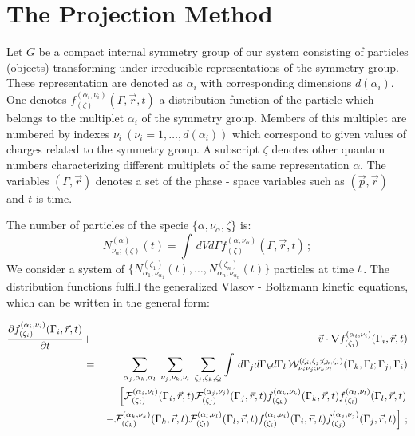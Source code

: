 \documentclass[a4paper,11pt]{article}
\begin{document}
\section{\normalsize\bf The Projection Method}\label{proj}
\noindent
 Let $G$ be a compact internal symmetry group of our system
consisting  of particles (objects) transforming under irreducible
representations of the symmetry group. These representation are
denoted as $\alpha_i$ with corresponding dimensions $d(\alpha_i)$.
One denotes $f^{(\alpha_i,\nu_i)}_{(\zeta)}(\Gamma,\vec r,t)$ a
distribution function of the particle which belongs to the
multiplet $\alpha_i$ of the symmetry group. Members of this
multiplet are numbered by indexes $\nu_i\
(\nu_i=1,\dots,d(\alpha_i))$ which correspond to given values of
charges related to the symmetry group. A subscript $\zeta$ denotes
other quantum numbers characterizing different multiplets of the
same representation $\alpha$.  The variables $(\Gamma,\vec r)$
denotes a  set of the phase - space variables such as $(\vec
p,\vec r)$ and $t$ is time.

The number of particles of the specie
$\{\alpha,\nu_\alpha,\zeta\}$ is:
\begin{equation}
N^{(\alpha)}_{\nu_\alpha;(\zeta)}(t)=\int\,dV d\Gamma
f^{(\alpha,\nu_\alpha)}_{(\zeta)}(\Gamma,\vec r,t)\,; \label{numb}
\end{equation}
We consider a system of
 $\{N_{\alpha_1, \nu_{\alpha_1}}^{(\zeta_1)}(t),\dots,
{N_{\alpha_n,\nu_{\alpha_n}}^{(\zeta_n)}(t)}\}$ particles at time
$t$\,.  The distribution functions fulfill the generalized Vlasov
- Boltzmann kinetic equations, which can be written in the general
form:

\begin{eqnarray}\label{kin}
{\partial f^{(\alpha_i,\nu_i)}_{(\zeta_i)}(\Gamma_i,\vec r,
t)\over\partial t}& + & \vec v\cdot\nabla
f^{(\alpha_i,\nu_i)}_{(\zeta_i)}(\Gamma_i,\vec r,t)\nonumber\\
&=&\sum_{\alpha_j,\alpha_k,\alpha_l}\;\sum_{\nu_j,\nu_k,\nu_l}\;
\sum_{\zeta_j,\zeta_k,\zeta_l}\int\, d\Gamma_j d\Gamma_k
d\Gamma_l\, {\cal
W}_{\nu_i\nu_j;\nu_k\nu_l}^{(\zeta_i,\zeta_j;\zeta_k,\zeta_l)}
(\Gamma_k,\Gamma_l;\Gamma_j,\Gamma_i)\nonumber\\ &\ &\left[ {\cal
F}^{(\alpha_i,\nu_i)}_{(\zeta_i)}(\Gamma_i,\vec r,t){\cal
F}^{(\alpha_j,\nu_j)}_{(\zeta_j)}(\Gamma_j,\vec r,t)
f^{(\alpha_k,\nu_k)}_{(\zeta_k)} (\Gamma_k,\vec
r,t)f^{(\alpha_l,\nu_l)}_{(\zeta_l)}(\Gamma_l,\vec r,t)\right.
\nonumber\\ &&\left.-{\cal
F}^{(\alpha_k,\nu_k)}_{(\zeta_k)}(\Gamma_k,\vec r,t){\cal
F}^{(\alpha_l,\nu_l)}_{(\zeta_l)}(\Gamma_l,\vec r,t)
f^{(\alpha_i,\nu_i)}_{(\zeta_i)}(\Gamma_i,\vec
r,t)f^{(\alpha_j,\nu_j)}_{(\zeta_j)} (\Gamma_j,\vec r,t)\right]\,;
\end{eqnarray}
\end{document}
